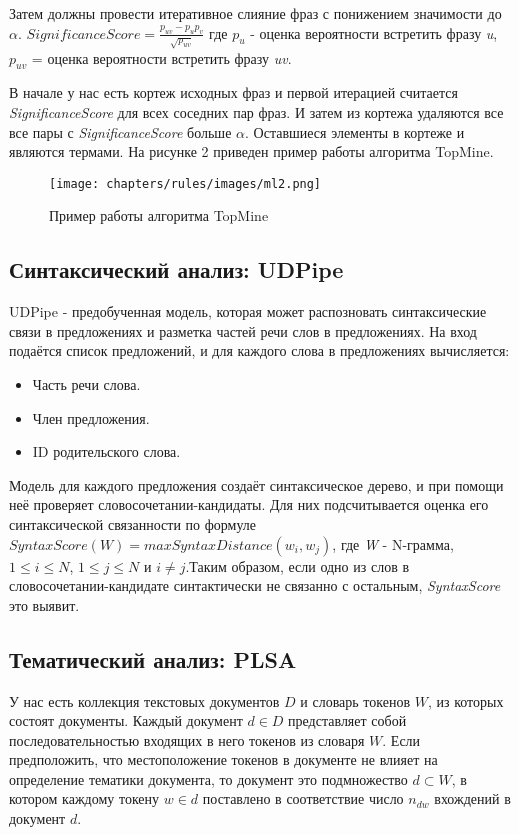 Затем должны провести итеративное слияние фраз с понижением значимости до $\alpha$.
$SignificanceScore = \frac{p_{uv}-p_{u}p_{v}}{\sqrt{p_{uv}}}$
где $p_{u}$ - оценка вероятности встретить фразу \textit{u}, $p_{uv}$ = оценка вероятности встретить фразу \textit{uv}.

В начале у нас есть кортеж исходных фраз и первой итерацией считается \textit{SignificanceScore} для всех соседних пар фраз. И затем из кортежа удаляются все все пары с \textit{SignificanceScore} больше $\alpha$. Оставшиеся элементы в кортеже и являются термами. На рисунке 2 приведен пример работы алгоритма TopMine.
\begin{figure}
    \texttt{[image: chapters/rules/images/ml2.png]}
    \caption{Пример работы алгоритма TopMine}
\end{figure}
\subsection*{Синтаксический анализ: UDPipe}

UDPipe - предобученная модель, которая может распозновать синтаксические связи в предложениях и разметка частей речи слов в предложениях. На вход подаётся список предложений, и для каждого слова в предложениях вычисляется:

\begin{itemize}
	\item Часть речи слова.
	\item Член предложения.
	\item ID родительского слова.
\end{itemize}

Модель для каждого предложения создаёт синтаксическое дерево, и при помощи неё проверяет словосочетании-кандидаты. Для них подсчитывается оценка его синтаксической связанности по формуле $SyntaxScore(W) = max SyntaxDistance(w_{i}, w_{j})$, где \textit{W} - N-грамма, $1 \leq i \leq N$, $1 \leq j \leq N$ и $i \neq j$.Таким образом, если одно из слов в словосочетании-кандидате синтактически не связанно с остальным, \textit{SyntaxScore} это выявит.

\subsection*{Тематический анализ: PLSA}

У нас есть коллекция текстовых документов $D$ и словарь токенов $W$, из которых состоят документы. Каждый документ $d \in D$ представляет собой последовательностью входящих в него токенов из словаря $W$. Если предположить, что местоположение токенов в документе не влияет на определение тематики документа, то документ это подмножество $d \subset W$, в котором каждому токену $w \in d$ поставлено в соответствие число $n_{dw}$ вхождений в документ $d$.

